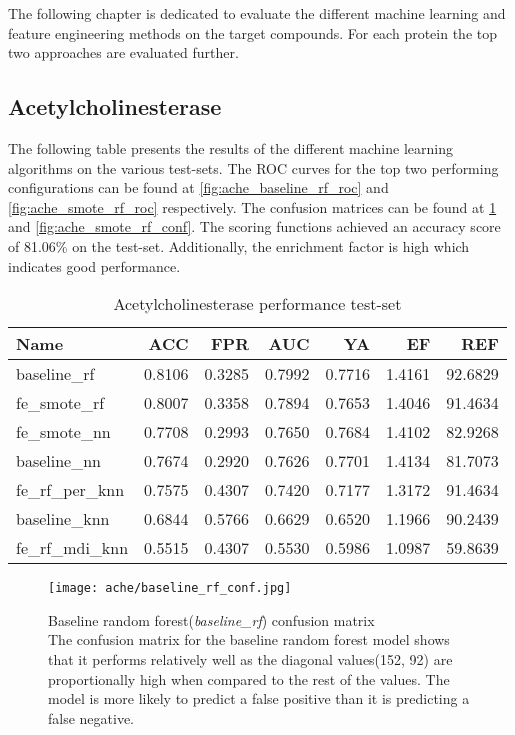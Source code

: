 \label{cha:performance_protein}
The following chapter is dedicated to evaluate the different machine learning and feature engineering methods on
the target compounds. For each protein the top two approaches are evaluated further.

\subsection{Acetylcholinesterase}
The following table presents the results of the different machine learning algorithms on the various
test-sets. The ROC curves for the top two performing configurations can be found at \ref{fig:ache_baseline_rf_roc} and \ref{fig:ache_smote_rf_roc}
respectively. The confusion matrices can be found at \ref{fig:ache_baseline_rf_conf} and \ref{fig:ache_smote_rf_conf}.
The scoring functions achieved an accuracy score of 81.06\% on the test-set. Additionally, the enrichment factor is high which indicates good performance.
\begin{table}[H]
    \begin{center}
        \caption{Acetylcholinesterase performance test-set}
        \begin{tabular}{lrrrrrr}
            \toprule
            Name             & ACC    & FPR    & AUC    & YA     & EF     & REF     \\
            \midrule
            baseline\_rf     & 0.8106 & 0.3285 & 0.7992 & 0.7716 & 1.4161 & 92.6829 \\
            fe\_smote\_rf    & 0.8007 & 0.3358 & 0.7894 & 0.7653 & 1.4046 & 91.4634 \\
            fe\_smote\_nn    & 0.7708 & 0.2993 & 0.7650 & 0.7684 & 1.4102 & 82.9268 \\
            baseline\_nn     & 0.7674 & 0.2920 & 0.7626 & 0.7701 & 1.4134 & 81.7073 \\
            fe\_rf\_per\_knn & 0.7575 & 0.4307 & 0.7420 & 0.7177 & 1.3172 & 91.4634 \\
            baseline\_knn    & 0.6844 & 0.5766 & 0.6629 & 0.6520 & 1.1966 & 90.2439 \\
            fe\_rf\_mdi\_knn & 0.5515 & 0.4307 & 0.5530 & 0.5986 & 1.0987 & 59.8639 \\
            \bottomrule
        \end{tabular}
    \end{center}
\end{table}

\begin{figure}[H]
    \begin{center}
        \captionsetup{justification=centering}
        \texttt{[image: ache/baseline\_rf\_conf.jpg]}
        \caption[]{Baseline random forest(\textit{baseline\_rf}) confusion matrix\\The confusion matrix for the baseline random forest model shows that it performs relatively well as the diagonal values(152, 92) are proportionally high
            when compared to the rest of the values. The model is more likely to predict a false positive than it is predicting a false negative.}
        \label{fig:ache_baseline_rf_conf}
    \end{center}
\end{figure}


